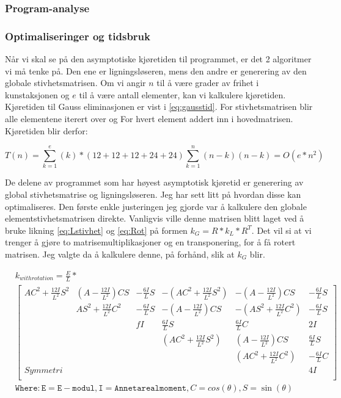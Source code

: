 \documentclass[10pt,a4paper, norsk]{article}
\begin{document}
\subsubsection{Program-analyse}

\subsubsection{Optimaliseringer og tidsbruk}
Når vi skal se på den asymptotiske kjøretiden til programmet, er det 2 algoritmer vi må tenke på. Den ene er ligningsløseren, mens den andre er generering av den globale stivhetsmatrisen. Om vi angir $n$ til å være grader av frihet i kunstaksjonen og $e$ til å være antall elementer, kan vi kalkulere kjøretiden. Kjøretiden til Gauss eliminasjonen er vist i \eqref{eq:gausstid}. For stivhetsmatrisen blir alle elementene iterert over og For hvert element addert inn i hovedmatrisen. Kjøretiden blir derfor:

\begin{equation} \label{eq:kjøretidGs}
T(n) = \sum_{k=1}^{e} (k)*(12+12+12+24+24) \sum_{k=1}^{n} (n-k)(n-k) = O(e*n^2)
\end{equation}  

De delene av programmet som har høyest asymptotisk kjøretid er generering av global stivhetsmatrise og ligningsløseren. Jeg har sett litt på hvordan disse kan optimaliseres. 
Den første enkle justeringen jeg gjorde var å kalkulere den globale elementstivhetsmatrisen direkte. Vanligvis ville denne matrisen blitt laget ved å bruke likning \ref{eq:Lstivhet} og \ref{eq:Rot} på formen $k_G=R*k_L*R^T$. Det vil si at vi trenger å gjøre to matrisemultiplikasjoner og en transponering, for å få rotert matrisen. Jeg valgte da å kalkulere denne, på forhånd, slik at $k_G$ blir. 

\begin{equation} 
\begin{aligned}
& k_{with rotation} = \frac{E}{L} * \\ 
&\begin{bmatrix}
AC^2+\frac{12I}{L^2} S^2  & (A-\frac{12I}{L^2})CS  &  -\frac{6I}{L}S & -(AC^2+\frac{12I}{L^2}S^2) & -(A-\frac{12I}{L^2})CS &  -\frac{6I}{L}S \\
 & AS^2 + \frac{12I}{L^2}C^2 & -\frac{6I}{L}S & -(A-\frac{12I}{L^2})CS & -(AS^2+\frac{12I}{L^2}C^2) &  -\frac{6I}{L}S \\
 & & fI &  \frac{6I}{L}S & \frac{6I}{L}C & 2I \\
 & & & (AC^2+\frac{12I}{L^2}S^2) & (A-\frac{12I}{L^2})CS & \frac{6I}{L}S\\
 & & & & (AC^2+\frac{12I}{L^2}C^2) & -\frac{6I}{L}C \\
 Symmetri & & & & & 4I \\
\end{bmatrix} \\
& \mathtt{ Where: E=E-modul, I=Annet arealmoment, } C=cos(\theta), S=\sin(\theta) \\
\end{aligned}
\end{equation}
\end{document}
